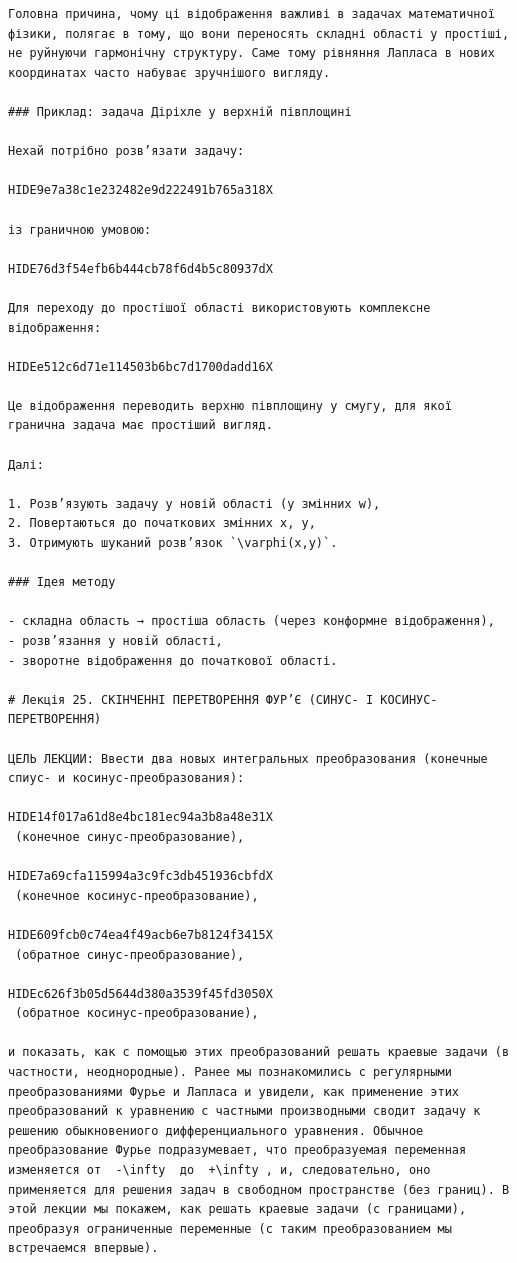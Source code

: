 \documentclass[
  ukrainian,
]{article}
\begin{document}
\begin{verbatim}
Головна причина, чому ці відображення важливі в задачах математичної фізики, полягає в тому, що вони переносять складні області у простіші, не руйнуючи гармонічну структуру. Саме тому рівняння Лапласа в нових координатах часто набуває зручнішого вигляду.

### Приклад: задача Діріхле у верхній півплощині

Нехай потрібно розв’язати задачу:

HIDE9e7a38c1e232482e9d222491b765a318X

із граничною умовою:

HIDE76d3f54efb6b444cb78f6d4b5c80937dX

Для переходу до простішої області використовують комплексне відображення:

HIDEe512c6d71e114503b6bc7d1700dadd16X

Це відображення переводить верхню півплощину у смугу, для якої гранична задача має простіший вигляд.

Далі:

1. Розв’язують задачу у новій області (у змінних w),
2. Повертаються до початкових змінних x, y,
3. Отримують шуканий розв’язок `\varphi(x,y)`.

### Ідея методу

- складна область → простіша область (через конформне відображення),
- розв’язання у новій області,
- зворотне відображення до початкової області.

# Лекція 25. СКІНЧЕННІ ПЕРЕТВОРЕННЯ ФУР’Є (СИНУС- І КОСИНУС-ПЕРЕТВОРЕННЯ)

ЦЕЛЬ ЛЕКЦИИ: Ввести два новых интегральных преобразования (конечные спиус- и косинус-преобразования):

HIDE14f017a61d8e4bc181ec94a3b8a48e31X
 (конечное синус-преобразование),

HIDE7a69cfa115994a3c9fc3db451936cbfdX
 (конечное косинус-преобразование),

HIDE609fcb0c74ea4f49acb6e7b8124f3415X
 (обратное синус-преобразование),

HIDEc626f3b05d5644d380a3539f45fd3050X
 (обратное косинус-преобразование),

и показать, как с помощью этих преобразований решать краевые задачи (в частности, неоднородные). Ранее мы познакомились с регулярными преобразованиями Фурье и Лапласа и увидели, как применение этих преобразований к уравнению с частными производными сводит задачу к решению обыкновениого дифференциального уравнения. Обычное преобразование Фурье подразумевает, что преобразуемая переменная изменяется от  -\infty  до  +\infty , и, следовательно, оно применяется для решения задач в свободном пространстве (без границ). В этой лекции мы покажем, как решать краевые задачи (с границами), преобразуя ограниченные переменные (с таким преобразованием мы встречаемся впервые).


\end{verbatim}
\end{document}
